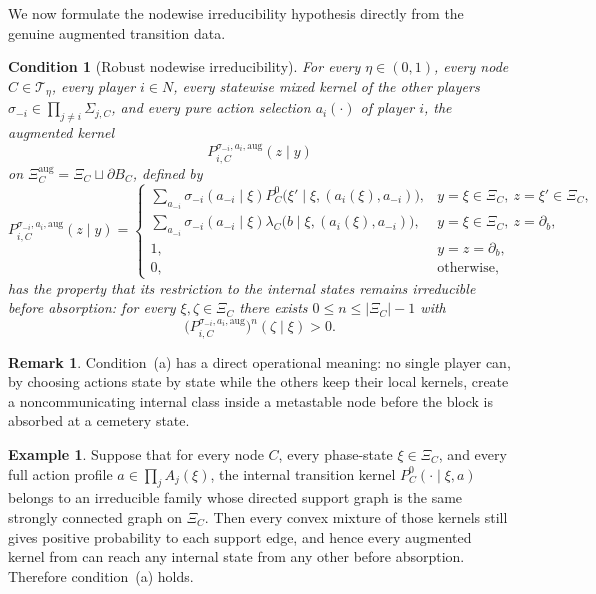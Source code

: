 \documentclass[12pt]{article}
\newtheorem{condition}[theorem]{Condition}
\theoremstyle{definition}
\newtheorem{remark}[theorem]{Remark}
\newtheorem{example}[theorem]{Example}
\newcommand{\1}{\mathbf{1}}
\newcommand{\cT}{\mathcal{T}}
\begin{document}
We now formulate the nodewise irreducibility hypothesis directly from the genuine
augmented transition data.

\begin{condition}[Robust nodewise irreducibility]
\label{cond:a}
For every $\eta\in(0,1)$, every node $C\in\cT_\eta$, every player $i\in N$, every
statewise mixed kernel of the other players
$\sigma_{-i}\in\prod_{j\ne i}\Sigma_{j,C}$, and every pure action selection
$a_i(\cdot)$ of player $i$, the augmented kernel
\[
P_{i,C}^{\sigma_{-i},a_i,\mathrm{aug}}(z\mid y)
\]
on $\Xi_C^{\mathrm{aug}}=\Xi_C\sqcup\partial B_C$, defined by
\[
P_{i,C}^{\sigma_{-i},a_i,\mathrm{aug}}(z\mid y)
=
\begin{cases}
\displaystyle
\sum_{a_{-i}}\sigma_{-i}(a_{-i}\mid\xi)
P_C^0\bigl(\xi'\mid\xi,(a_i(\xi),a_{-i})\bigr),
& y=\xi\in\Xi_C,\ z=\xi'\in\Xi_C,\\[0.7em]
\displaystyle
\sum_{a_{-i}}\sigma_{-i}(a_{-i}\mid\xi)
\lambda_C\bigl(b\mid\xi,(a_i(\xi),a_{-i})\bigr),
& y=\xi\in\Xi_C,\ z=\partial_b,\\[0.7em]
1, & y=z=\partial_b,\\
0, & \text{otherwise,}
\end{cases}
\]
has the property that its restriction to the internal states remains irreducible
before absorption: for every $\xi,\zeta\in\Xi_C$ there exists
$0\le n\le |\Xi_C|-1$ with
\[
\bigl(P_{i,C}^{\sigma_{-i},a_i,\mathrm{aug}}\bigr)^n(\zeta\mid\xi)>0.
\]
\end{condition}

\begin{remark}
Condition~\textnormal{(a)} has a direct operational meaning: no single player can,
by choosing actions state by state while the others keep their local kernels,
create a noncommunicating internal class inside a metastable node before the block
is absorbed at a cemetery state.
\end{remark}

\begin{example}
\label{ex:cond-a-trivial}
Suppose that for every node $C$, every phase-state $\xi\in\Xi_C$, and every full
action profile $a\in\prod_j A_j(\xi)$, the internal transition kernel
$P_C^0(\cdot\mid\xi,a)$ belongs to an irreducible family whose directed support
graph is the same strongly connected graph on $\Xi_C$. Then every convex mixture
of those kernels still gives positive probability to each support edge, and hence
every augmented kernel from  can reach any internal state from any
other before absorption. Therefore condition~\textnormal{(a)} holds.
\end{example}
\end{document}

